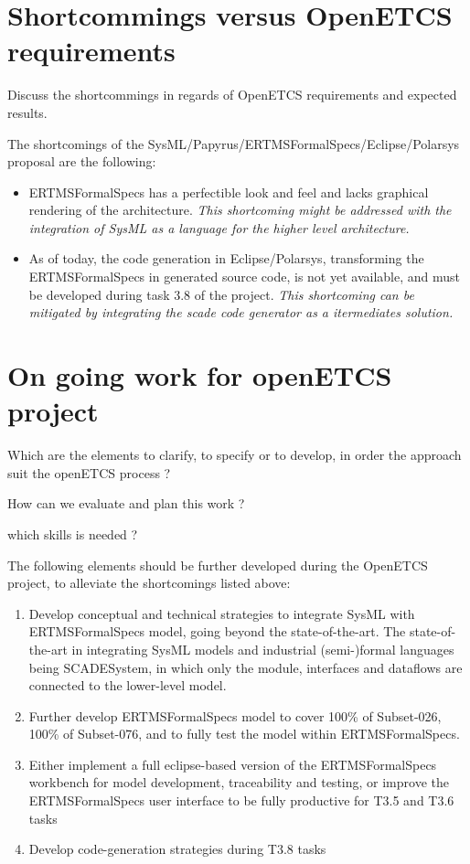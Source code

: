 \section{Shortcommings versus OpenETCS requirements}

\begin{todo_comment}
Discuss the shortcommings in regards of OpenETCS requirements and expected results.
\end{todo_comment}

The shortcomings of the SysML/Papyrus/ERTMSFormalSpecs/Eclipse/Polarsys proposal are the following:

\begin{itemize}
	\item ERTMSFormalSpecs has a perfectible look and feel and lacks graphical rendering of the architecture. \emph{This shortcoming might be addressed with the integration of SysML as a language for the higher level architecture.}
	\item As of today, the code generation in Eclipse/Polarsys, transforming the ERTMSFormalSpecs in generated source code, is not yet available, and must be developed during task 3.8 of the project. \emph{This shortcoming can be mitigated by integrating the scade code generator as a itermediates solution.}
\end{itemize}

\section{On going work for openETCS project}

\begin{todo_comment}
Which are the elements to clarify, to specify or to develop, in order the approach suit the openETCS process ?

How can we evaluate and plan this work ?

which skills is needed ?
\end{todo_comment}

The following elements should be further developed during the OpenETCS project, to alleviate the shortcomings listed above:

\begin{enumerate}
  \item Develop conceptual and technical strategies to integrate SysML with ERTMSFormalSpecs model, going beyond the state-of-the-art. The state-of-the-art in integrating SysML models and industrial (semi-)formal languages being SCADESystem, in which only the module, interfaces and dataflows are connected to the lower-level model.
	\item Further develop ERTMSFormalSpecs model to cover 100\% of Subset-026, 100\% of Subset-076, and to fully test the model within ERTMSFormalSpecs. 
	\item Either implement a full eclipse-based version of the ERTMSFormalSpecs workbench for model development, traceability and testing, or improve the ERTMSFormalSpecs user interface to be fully productive for T3.5 and T3.6 tasks
	\item Develop code-generation strategies during T3.8 tasks
\end{enumerate}

